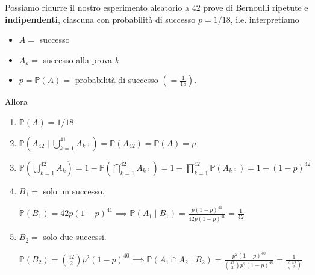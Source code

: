 Possiamo ridurre il nostro esperimento aleatorio a $42$ prove di Bernoulli ripetute e \textbf{indipendenti}, ciascuna con probabilità di successo $p=1/18$, i.e. interpretiamo
\begin{itemize}
\item $A=$ successo
\item $A_{k} =$ successo alla prova $k$
\item $p=\mathbb{P}( A) =$ probabilità di successo $\left( =\frac{1}{18}\right)$.
\end{itemize}

Allora
\begin{enumerate}
\item $\mathbb{P}( A) =1/18$
\item $\mathbb{P}\left( A_{42} \mid \bigcup _{k=1}^{41} A_{k}\comp\right) =\mathbb{P}( A_{42}) =\mathbb{P}( A) =p$
\item $\mathbb{P}\left(\bigcup _{k=1}^{42} A_{k}\right) =1-\mathbb{P}\left(\bigcap _{k=1}^{42} A_{k}\comp\right) =1-\prod _{k=1}^{42}\mathbb{P}\left( A_{k}\comp\right) =1-( 1-p)^{42}$
\item $B_{1} =$ solo un successo.

$\mathbb{P}( B_{1}) =42p( 1-p)^{41} \implies \mathbb{P}( A_{1} \mid B_{1}) =\frac{p( 1-p)^{41}}{42p( 1-p)^{41}} =\frac{1}{42}$
\item $B_{2} =$ solo due successi.

$\mathbb{P}( B_{2}) =\binom{42}{2} p^{2}( 1-p)^{40} \implies \mathbb{P}( A_{1} \cap A_{2} \mid B_{2}) =\frac{p^{2}( 1-p)^{40}}{\binom{42}{2} p^{2}( 1-p)^{40}} =\frac{1}{\binom{42}{2}}$
\end{enumerate}
\Soluzione


